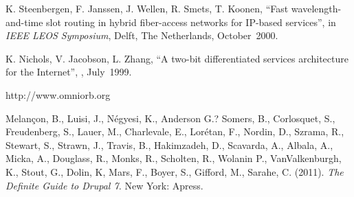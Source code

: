 \begin{thebibliography}{99}

 
 K. Steenbergen, F. Janssen, J. Wellen, R. Smets, T.
Koonen,
\newblock ``Fast wavelength-and-time slot routing in hybrid fiber-access
networks for IP-based services'',
\newblock in {\em IEEE LEOS Symposium}, Delft, The Netherlands,
October~2000.
 
 K. Nichols, V. Jacobson, L. Zhang,
\newblock ``A two-bit differentiated services architecture for the
Internet'',
,
July~1999.                                       

 http://www.omniorb.org

 Melançon, B., Luisi, J., Négyesi, K., Anderson G.? Somers, B., Corlosquet, S., Freudenberg, S., Lauer, M., Charlevale, E., Lorétan, F., Nordin, D., Szrama, R., Stewart, S., Strawn, J., Travis, B., Hakimzadeh, D., Scavarda, A., Albala, A., Micka, A., Douglass, R., Monks, R., Scholten, R., Wolanin P., VanValkenburgh, K., Stout, G., Dolin, K, Mars, F., Boyer, S., Gifford, M., Sarahe, C. (2011). {\em The Definite Guide to Drupal 7.} New York: Apress.

\end{thebibliography}

